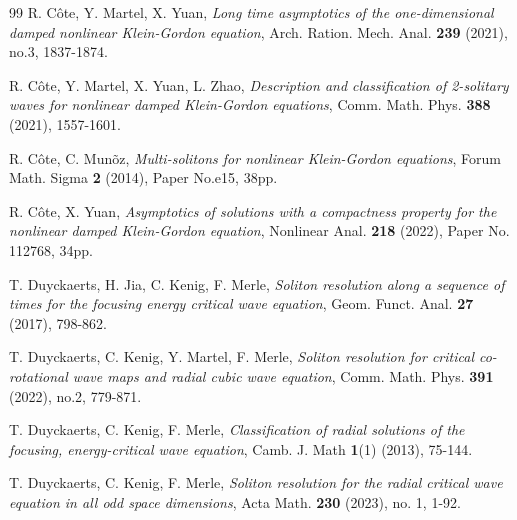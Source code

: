\documentclass[reqno]{amsart}
\theoremstyle{plain}
\theoremstyle{definition}
\numberwithin{equation}{section}
\newcommand{\1}{\mathbbm{1}}
\begin{document}
\begin{thebibliography}{99}
 R. C\^{o}te, Y. Martel, X. Yuan, 
\textit{Long time asymptotics of the one-dimensional damped nonlinear Klein-Gordon equation},
Arch. Ration. Mech. Anal. {\bf 239} (2021), no.3, 1837-1874.



 R. C\^{o}te, Y. Martel, X. Yuan, L. Zhao,
\textit{Description and classification of 2-solitary waves for nonlinear damped Klein-Gordon equations},
Comm. Math. Phys. \textbf{388} (2021), 1557-1601.



 R. C\^{o}te, C. Mun\~{o}z,
\textit{Multi-solitons for nonlinear Klein-Gordon equations},
Forum Math. Sigma \textbf{2} (2014), Paper No.e15, 38pp.



 R. C\^{o}te, X. Yuan,
\textit{Asymptotics of solutions with a compactness property for the nonlinear damped Klein-Gordon equation},
Nonlinear Anal. \textbf{218} (2022), Paper No. 112768, 34pp.

 T. Duyckaerts, H. Jia, C. Kenig, F. Merle,
\textit{Soliton resolution along a sequence of times for the focusing energy critical wave equation},
Geom. Funct. Anal. \textbf{27} (2017), 798-862.

 T. Duyckaerts, C. Kenig, Y. Martel, F. Merle,
\textit{Soliton resolution for critical co-rotational wave maps and radial cubic wave equation},
Comm. Math. Phys. \textbf{391} (2022), no.2, 779-871.


 T. Duyckaerts, C. Kenig, F. Merle,
\textit{Classification of radial solutions of the focusing, energy-critical wave equation},
Camb. J. Math \textbf{1}(1) (2013), 75-144.



 T. Duyckaerts, C. Kenig, F. Merle,
\textit{Soliton resolution for the radial critical wave equation in all odd space dimensions},
Acta Math. \textbf{230} (2023), no. 1, 1-92.




\end{thebibliography}
\end{document}
